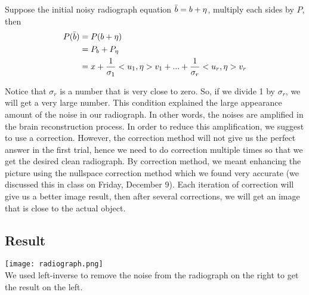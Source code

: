 \documentclass{article}
\begin{document}
Suppose the initial noisy radiograph equation $\Bar{b} = b + \eta$, multiply each sides by $P$, then
\begin{equation}
    \begin{aligned}
        P(\Bar{b}) &=P(b+\eta)\\
                    &= P_b + P_\eta\\ \nonumber
                    &= x+\frac{1}{\sigma_1}<u_1,\eta>v_1+...+\frac{1}{\sigma_r}<u_r,\eta>v_r
    \end{aligned}
\end{equation}

Notice that $\sigma_r$ is a number that is very close to zero. So, if we divide 1 by $\sigma_r$, we will get a very large number. This condition explained the large appearance amount of the noise in our radiograph. In other words, the noises are amplified in the brain reconstruction process. In order to reduce this amplification, we suggest to use a correction. However, the correction method will not give us the perfect answer in the first trial, hence we need to do correction multiple times so that we get the desired clean radiograph. By correction method, we meant enhancing the picture using the nullspace correction method which we found very accurate (we discussed this in class on Friday, December 9). Each iteration of correction will give us a better image result, then after several corrections, we will get an image that is close to the actual object.

\subsection{Result}
\texttt{[image: radiograph.png]}\\
We used left-inverse to remove the noise from the radiograph on the right to get the result on the left.

\pagebreak
\end{document}
